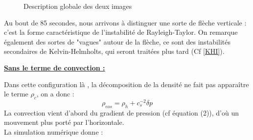 \documentclass{rapportECC}
\begin{document}
\begin{figure}[htb]
    \centering
    \hfill
    \caption{Description globale des deux images}
    \label{fig:images_cote_a_cote}
\end{figure}

Au bout de 85 secondes, nous arrivons à distinguer une sorte de flèche verticale : c'est la forme caractéristique de l'instabilité de Rayleigh-Taylor. On remarque également des sortes de "vagues" autour de la flèche, ce sont des instabilités secondaires de Kelvin-Helmholts, qui seront traitées plus tard (Cf \ref{KHI}).


\vspace{1 cm}


\underline{\textbf{Sans le terme de convection :}} 
\label{sans rhoc}
\vspace{0.5 cm}

Dans cette configuration là , la décomposition de la densité ne fait pas apparaître le terme $\rho_c$, on a donc :
\begin{equation}
    \rho_{eos} = \rho_h + c_s^{-2}\delta p
\end{equation}
La convection vient d'abord du gradient de pression (cf équation (2)), d'où un mouvement plus porté par l'horizontale. 
\\
La simulation numérique donne :
\end{document}
